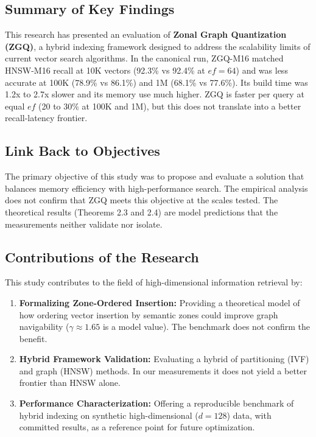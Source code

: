 \documentclass[conference]{IEEEtran}
\begin{document}
\subsection{Summary of Key Findings}
This research has presented an evaluation of \textbf{Zonal Graph Quantization (ZGQ)}, a hybrid indexing framework designed to address the scalability limits of current vector search algorithms. In the canonical run, ZGQ-M16 matched HNSW-M16 recall at 10K vectors (92.3\% vs 92.4\% at $ef=64$) and was less accurate at 100K (78.9\% vs 86.1\%) and 1M (68.1\% vs 77.6\%). Its build time was 1.2x to 2.7x slower and its memory use much higher. ZGQ is faster per query at equal $ef$ (20 to 30\% at 100K and 1M), but this does not translate into a better recall-latency frontier.

\subsection{Link Back to Objectives}
The primary objective of this study was to propose and evaluate a solution that balances memory efficiency with high-performance search. The empirical analysis does not confirm that ZGQ meets this objective at the scales tested. The theoretical results (Theorems 2.3 and 2.4) are model predictions that the measurements neither validate nor isolate.

\subsection{Contributions of the Research}
This study contributes to the field of high-dimensional information retrieval by:
\begin{enumerate}
    \item \textbf{Formalizing Zone-Ordered Insertion:} Providing a theoretical model of how ordering vector insertion by semantic zones could improve graph navigability ($\gamma \approx 1.65$ is a model value). The benchmark does not confirm the benefit.
    \item \textbf{Hybrid Framework Validation:} Evaluating a hybrid of partitioning (IVF) and graph (HNSW) methods. In our measurements it does not yield a better frontier than HNSW alone.
    \item \textbf{Performance Characterization:} Offering a reproducible benchmark of hybrid indexing on synthetic high-dimensional ($d=128$) data, with committed results, as a reference point for future optimization.
\end{enumerate}
\end{document}
